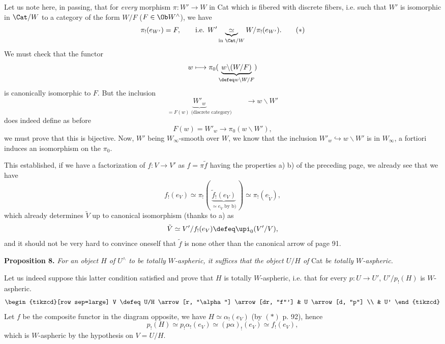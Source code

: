 Let us note here, in passing, that for \textit{every} morphism $\pi : W' \longrightarrow W$ in Cat which is fibered with discrete fibers, i.e. such that $W'$ is isomorphic in $\Cat/W$ to a category of the form $W/F$ ($F \in \Ob W^{\wedge}$), we have
\[ \pi_!(e_{W'}) = F, \qquad \text{i.e. } W' \underbrace{\ \simeq\ }_{\text{in } \Cat/W} W/\pi_!(e_{W'}). \tag*{$(*)$} \]
We must check that the functor
\[ w \longmapsto \pi_0(\underbrace{w\backslash(W/F)}_{\defeq w\backslash W/F}) \]
is canonically isomorphic to $F$. But the inclusion
\[ \underbrace{W'_w}_{= F(w) \text{ (discrete category)}} \qquad \longrightarrow w\backslash W' \]
does indeed define as before
\[ F(w) = W'_w \longrightarrow \pi_0(w\backslash W'), \]
we must prove that this is bijective. Now, $W'$ being $W_\infty$-smooth over $W$, we know that the inclusion $W'_w \hookrightarrow w\backslash W'$ is in $W_\infty$, a fortiori induces an isomorphism on the $\pi_0$.

This established, if we have a factorization of $f : V \longrightarrow V'$ as $f = \pi\tilde{f}$ having the properties a) b) of the preceding page, we already see that we have
\[ f_!(e_V) \simeq \pi_!(\, \underbrace{\tilde{f}_!(e_V)}_{\simeq e_{\tilde{V}} \text{ by b)}} \,) \simeq \pi_!(e_{\tilde{V}}), \]
which already determines $\tilde{V}$ up to canonical isomorphism (thanks to a) as
\[ \tilde{V} \simeq V'/f_!(e_V) \defeq \upi_0(V'/V), \] %
and it should not be very hard to convince oneself that $\tilde{f}$ is none other than the canonical arrow of page 91.

\textbf{Proposition 8.} \textit{For an object $H$ of $U^{\wedge}$ to be totally $W$-aspheric, it suffices that the object $U/H$ of} Cat \textit{be totally $W$-aspheric.}

Let us indeed suppose this latter condition satisfied and prove that $H$ is totally $W$-aspheric, i.e. that for every $p : U \longrightarrow U'$, $U'/p_!(H)$ is $W$-aspheric.
\[
\begin{tikzcd}[row sep=large]
V \defeq U/H \arrow[r, "\alpha"] \arrow[dr, "f"'] & U \arrow[d, "p"] \\
 & U'
\end{tikzcd}
\]
Let $f$ be the composite functor in the diagram opposite, we have $H \simeq \alpha_!(e_V)$ (by $(*)$ p. 92), hence
\[ p_!(H) \simeq p_!\alpha_!(e_V) \simeq (p\alpha)_!(e_V) \simeq f_!(e_V), \]
which is $W$-aspheric by the hypothesis on $V = U/H$.

